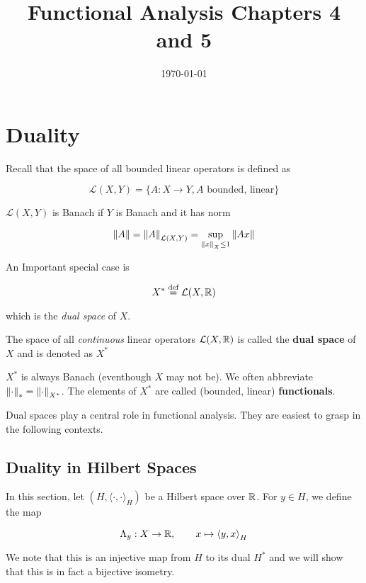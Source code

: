 \documentclass{article}
\title{Functional Analysis Chapters 4 and 5}
\date{\today}
\begin{document}
\maketitle

\section{Duality}  

Recall that the space of all bounded linear operators is defined as

\[
\mathcal{L}(X,Y) = \{A: X \to Y, A \textrm{ bounded, linear}\}
\] 
 
\(\mathcal{L}(X,Y)\) is Banach if  \(Y\) is Banach and it has norm  

\[
\left\|{A}\right\| = \left\|{A}\right\|_{\mathcal{L}(X,Y)} = \sup_{\left\|{x}\right\|_X \leq 1} \left\|{Ax}\right\|
\]  

An Important special case is  

\[
X^* \overset{\textrm{def}}{=} \mathcal{L}(X,\mathbb{R})
\]  

which is the \textit{dual space} of  \(X\).  

\begin{definition}\nextline
    The space of all \textit{continuous} linear operators  \(\mathcal{L}(X, \mathbb{R})\) is called the \textbf{dual space} of  \(X\) and is denoted as   \(X^*\)
\end{definition}  

\begin{remark}
     \(X^*\) is always Banach (eventhough  \(X\) may not be). We often abbreviate  \(\left\|{\cdot}\right\|_* = \left\|{\cdot}\right\|_{X^*}\). The elements of  \(X^*\) are called (bounded, linear) \textbf{functionals}.
\end{remark}

Dual spaces play a central role in functional analysis. They are easiest to grasp in the following contexts.  

\subsection{Duality in Hilbert Spaces}  
In this section, let  \((H, {\langle \cdot, \cdot \rangle}_H )\) be a Hilbert space over  \(\mathbb{R}\). For  \(y\in H\), we define the map  

\begin{equation*}
    \Lambda_y: X \to \mathbb{R}, \qquad x \mapsto {\langle y, x \rangle}_H
\end{equation*}  

We note that this is an injective map from  \(H\) to its dual  \(H^*\) and we will show that this is in fact a bijective isometry.  
\end{document}
